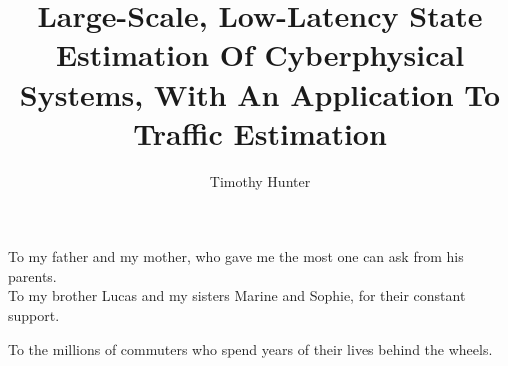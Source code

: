 \documentclass[masters]{ucbthesis}
\begin{document}

\title{Large-Scale, Low-Latency State Estimation Of Cyberphysical Systems, 
With An Application To Traffic Estimation}
\author{Timothy Hunter}




\maketitle
\approvalpage
\copyrightpage



\begin{frontmatter}

\begin{dedication}
\null\vfil
\begin{center}
To my father and my mother, who gave me the most one can ask from his parents.\\

To my brother Lucas and my sisters Marine and Sophie, for their constant support.\\\vspace{12pt}

To the millions of commuters who spend years of their lives behind the wheels.\\\vspace{12pt}
\end{center}
\vfil\null
\end{dedication}

\tableofcontents
\clearpage
\listoffigures
\clearpage
\listofalgorithms

\begin{acknowledgements}

\end{acknowledgements}

\end{frontmatter}
\end{document}
